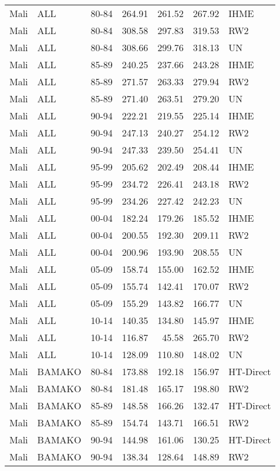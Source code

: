 \begin{longtable}{lllrrrl}
  Mali & ALL & 80-84 & 264.91 & 261.52 & 267.92 & IHME \\ 
  Mali & ALL & 80-84 & 308.58 & 297.83 & 319.53 & RW2 \\ 
  Mali & ALL & 80-84 & 308.66 & 299.76 & 318.13 & UN \\ 
  Mali & ALL & 85-89 & 240.25 & 237.66 & 243.28 & IHME \\ 
  Mali & ALL & 85-89 & 271.57 & 263.33 & 279.94 & RW2 \\ 
  Mali & ALL & 85-89 & 271.40 & 263.51 & 279.20 & UN \\ 
  Mali & ALL & 90-94 & 222.21 & 219.55 & 225.14 & IHME \\ 
  Mali & ALL & 90-94 & 247.13 & 240.27 & 254.12 & RW2 \\ 
  Mali & ALL & 90-94 & 247.33 & 239.50 & 254.41 & UN \\ 
  Mali & ALL & 95-99 & 205.62 & 202.49 & 208.44 & IHME \\ 
  Mali & ALL & 95-99 & 234.72 & 226.41 & 243.18 & RW2 \\ 
  Mali & ALL & 95-99 & 234.26 & 227.42 & 242.23 & UN \\ 
  Mali & ALL & 00-04 & 182.24 & 179.26 & 185.52 & IHME \\ 
  Mali & ALL & 00-04 & 200.55 & 192.30 & 209.11 & RW2 \\ 
  Mali & ALL & 00-04 & 200.96 & 193.90 & 208.55 & UN \\ 
  Mali & ALL & 05-09 & 158.74 & 155.00 & 162.52 & IHME \\ 
  Mali & ALL & 05-09 & 155.74 & 142.41 & 170.07 & RW2 \\ 
  Mali & ALL & 05-09 & 155.29 & 143.82 & 166.77 & UN \\ 
  Mali & ALL & 10-14 & 140.35 & 134.80 & 145.97 & IHME \\ 
  Mali & ALL & 10-14 & 116.87 & 45.58 & 265.70 & RW2 \\ 
  Mali & ALL & 10-14 & 128.09 & 110.80 & 148.02 & UN \\ 
  Mali & BAMAKO & 80-84 & 173.88 & 192.18 & 156.97 & HT-Direct \\ 
  Mali & BAMAKO & 80-84 & 181.48 & 165.17 & 198.80 & RW2 \\ 
  Mali & BAMAKO & 85-89 & 148.58 & 166.26 & 132.47 & HT-Direct \\ 
  Mali & BAMAKO & 85-89 & 154.74 & 143.71 & 166.51 & RW2 \\ 
  Mali & BAMAKO & 90-94 & 144.98 & 161.06 & 130.25 & HT-Direct \\ 
  Mali & BAMAKO & 90-94 & 138.34 & 128.64 & 148.89 & RW2 \\ 

\end{longtable}
